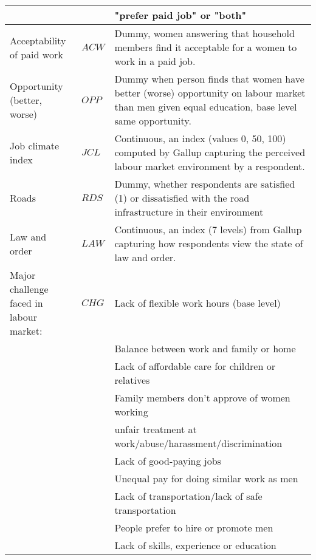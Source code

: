 \begin{longtable}{|p{}|p{}|p{}|}
		&& "prefer paid job" or "both" \\
		\hline
		Acceptability of paid work &$ACW$ & Dummy, women answering that household members find it acceptable for a women to work in a paid job. \\
		\hline
		Opportunity (better, worse) &$OPP$ & Dummy when person finds that women have better (worse) opportunity on labour market than men given equal education, base level same opportunity. \\
		\hline
		Job climate index &$JCL$ & Continuous, an index (values 0, 50, 100) computed by Gallup capturing the perceived labour market environment by a respondent.  \\
		\hline
		Roads &$RDS$ & Dummy, whether respondents are satisfied (1) or dissatisfied with the road infrastructure in their environment\\
		\hline
		Law and order &$LAW$ & Continuous, an index (7 levels) from Gallup capturing how respondents view the state of law and order.\\
		\hline
		\multirow{1}{0.3\textwidth}{Major challenge faced in labour market:} &$CHG$ & Lack of flexible work hours (base level)\\
		&& Balance between work and family or home\\
		&& Lack of affordable care for children or relatives\\
		&& Family members don't approve of women working\\
		&& unfair treatment at work/abuse/harassment/discrimination\\
		&& Lack of good-paying jobs\\
		&& Unequal pay for doing similar work as men\\
		&& Lack of transportation/lack of safe transportation \\
		&& People prefer to hire or promote men\\
		&& Lack of skills, experience or education
	\label{tab:vardescription}%
	\end{longtable}%
